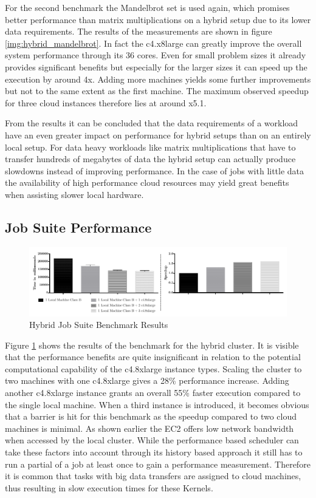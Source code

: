 For the second benchmark the Mandelbrot set is used again, which promises better performance than matrix multiplications on a hybrid setup due to its lower data requirements. The results of the measurements are shown in figure \ref{img:hybrid_mandelbrot}. In fact the c4.x8large can greatly improve the overall system performance through its 36 cores. Even for small problem sizes it already provides significant benefits but especially for the larger sizes it can speed up the execution by around 4x. Adding more machines yields some further improvements but not to the same extent as the first machine. The maximum observed speedup for three cloud instances therefore lies at around x5.1. 

From the results it can be concluded that the data requirements of a workload have an even greater impact on performance for hybrid setups than on an entirely local setup. For data heavy workloads like matrix multiplications that have to transfer hundreds of megabytes of data the hybrid setup can actually produce slowdowns instead of improving performance. In the case of jobs with little data the availability of high performance cloud resources may yield great benefits when assisting slower local hardware.

\subsection*{Job Suite Performance}

\begin{figure}[H]	
	\includegraphics[width=1.0\textwidth]{images/hybrid_full_benchmark_performance_based.pdf}
	\centering
	\caption{Hybrid Job Suite Benchmark Results}
	\label{img:hybrid_benchmark_results}
\end{figure}

Figure \ref{img:hybrid_benchmark_results} shows the results of the benchmark for the hybrid cluster. It is visible that the performance benefits are quite insignificant in relation to the potential computational capability of the c4.8xlarge instance types. Scaling the cluster to two machines with one c4.8xlarge gives a 28\% performance increase. Adding another c4.8xlarge instance grants an overall 55\% faster execution compared to the single local machine. When a third instance is introduced, it becomes obvious that a barrier is hit for this benchmark as the speedup compared to two cloud machines is minimal. As shown earlier the EC2 offers low network bandwidth when accessed by the local cluster. While the performance based scheduler can take these factors into account through its history based approach it still has to run a partial of a job at least once to gain a performance measurement. Therefore it is common that tasks with big data transfers are assigned to cloud machines, thus resulting in slow execution times for these Kernels. 

